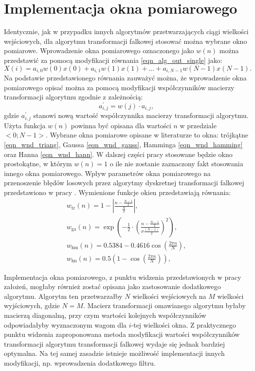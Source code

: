 \section{Implementacja okna pomiarowego}

Identycznie, jak w przypadku innych algorytmów przetwarzających ciągi wielkości wejściowych, dla algorytmu transformacji falkowej stosować można wybrane okno pomiarowe. Wprowadzenie okna pomiarowego oznaczonego jako $w(n)$ można przedstawić za pomocą modyfikacji równania \eqref{eqn_alg_out_single} jako:
\begin{equation}
X(i) = a_{i, 0} w(0) x(0) + a_{i, 1} w(1) x(1) + \hdots + a_{i, N-1} w(N-1) x(N-1) \label{eqn_wt_singlewindow}.
\end{equation}
Na podstawie przedstawionego równania zauważyć można, że wprowadzenie okna pomiarowego opisać można za pomocą modyfikacji współczynników macierzy transformacji algorytmu zgodnie z zależnością:
\begin{equation}
a_{i,j}^{'} = w(j) \cdot a_{i,j} \label{eqn_wt_windowmod},
\end{equation}
gdzie $a_{i,j}^{'}$ stanowi nową wartość współczynnika macierzy transformacji algorytmu. Użyta funkcja $w(n)$ powinna być opisana dla wartości $n$ w przedziale $<0;N-1>$. Wybrane okna pomiarowe opisane w literaturze \cite{oppenheim_dsp} to okna: trójkątne \eqref{eqn_wnd_triang}, Gaussa \eqref{eqn_wnd_gauss}, Hamminga \eqref{eqn_wnd_hamming} oraz Hanna \eqref{eqn_wnd_hann}. W dalszej części pracy stosowane będzie okno prostokątne, w którym $w(n) = 1$ o ile nie zostanie zaznaczony fakt stosowania innego okna pomiarowego. Wpływ parametrów okna pomiarowego na przenoszenie błędów losowych przez algorytmy dyskretnej transformacji falkowej przedstawiono w pracy \cite{auth_window}. Wymienione funkcje okien przedstawiają równania:
\begin{gather}
w_{\text{tr}}(n) = 1 - \left| \frac{n - \frac{N-1}{2}}{\frac{N}{2}} \right| \label{eqn_wnd_triang}, \\
w_{\text{ga}}(n) = \exp \left(-\frac{1}{2} \cdot \left( \frac{n - \frac{N-1}{2}}{\sigma \frac{(N-1)}{2}} \right)^2 \right) \label{eqn_wnd_gauss}, \\
w_{\text{hm}}(n) =  0.5384 - 0.4616 \cos \left( \frac{2 \pi n}{N} \right) \label{eqn_wnd_hamming}, \\
w_{\text{hn}}(n) = 0.5 \left(1 - \cos \left( \frac{2 \pi n}{N} \right) \right) \label{eqn_wnd_hann},
\end{gather}

Implementacja okna pomiarowego, z punktu widzenia przedstawionych w pracy założeń, mogłaby również zostać opisana jako zastosowanie dodatkowego algorytmu. Algorytm ten przetwarzałby $N$ wielkości wejściowych na $M$ wielkości wyjściowych, gdzie $N = M$. Macierz transformacji omawianego algorytmu byłaby macierzą diagonalną, przy czym wartości kolejnych współczynników odpowiadałyby wyznaczonym wagom dla $i$-tej wielkości okna. Z praktycznego punktu widzenia zaproponowana metoda modyfikacji wartości współczynników transformacji algorytmu transformacji falkowej wydaje się jednak bardziej optymalna. Na tej samej zasadzie istnieje możliwość implementacji innych modyfikacji, np. wprowadzenia dodatkowego filtru.

